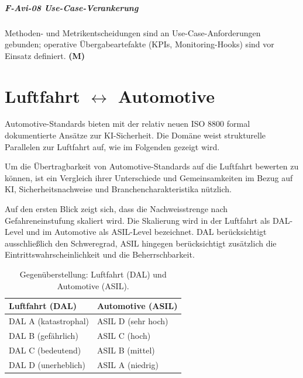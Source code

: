 \paragraph {F-Avi-08 Use-Case-Verankerung}
  {Methoden- und Metrikentscheidungen sind an Use-Case-Anforderungen gebunden; operative Übergabeartefakte 
  (KPIs, Monitoring-Hooks) sind vor Einsatz definiert. 
  \textbf{(M)}}









\chapter{Luftfahrt \(\leftrightarrow\) Automotive}\label{chap:automotiv}

Automotive-Standards bieten mit der relativ neuen ISO 8800 formal dokumentierte Ansätze zur KI-Sicherheit. 
Die Domäne weist strukturelle Parallelen zur Luftfahrt auf, wie im Folgenden gezeigt wird. 

Um die Übertragbarkeit von Automotive-Standards auf die Luftfahrt bewerten zu können, ist ein Vergleich ihrer Unterschiede 
und Gemeinsamkeiten im Bezug auf KI, Sicherheitsnachweise und Branchencharakteristika nützlich.

Auf den ersten Blick zeigt sich, dass die Nachweisstrenge nach Gefahreneinstufung skaliert wird. Die Skalierung wird 
in der Luftfahrt als DAL-Level und 
im Automotive als ASIL-Level bezeichnet. DAL berücksichtigt ausschließlich den Schweregrad, ASIL hingegen 
berücksichtigt zusätzlich die Eintrittswahrscheinlichkeit und die Beherrschbarkeit.
\begin{table}[h]
\centering
\caption{Gegenüberstellung: Luftfahrt (DAL) und Automotive (ASIL).}
\begin{tabular}{p{} p{}}
\toprule
\textbf{Luftfahrt (DAL)} & \textbf{Automotive (ASIL)} \\
\midrule
DAL A (katastrophal) & ASIL D (sehr hoch)\\
DAL B (gefährlich) & ASIL C (hoch) \\
DAL C (bedeutend) & ASIL B (mittel)\\
DAL D (unerheblich) & ASIL A (niedrig)  \\
\bottomrule
\end{tabular}
\end{table}

